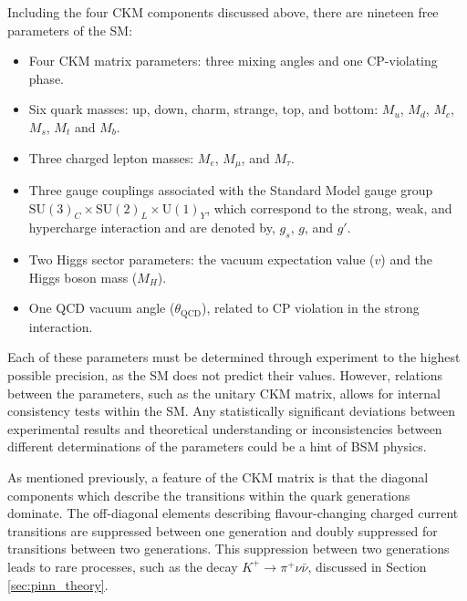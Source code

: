 \documentclass[../main.tex]{subfiles}
\begin{document}
    Including the four \gls{CKM} components discussed above, there are nineteen free parameters of the \gls{SM}:
    \begin{itemize}
        \item Four \gls{CKM} matrix parameters: three mixing angles and one CP-violating phase.
        \item Six quark masses: up, down, charm, strange, top, and bottom: $M_u$, $M_d$, $M_c$, $M_s$, $M_t$ and $M_b$.
        \item Three charged lepton masses: $M_e$, $M_\mu$, and $M_\tau$.
        \item Three gauge couplings associated with the Standard Model gauge group $\mathrm{SU}(3)_C \times \mathrm{SU}(2)_L \times \mathrm{U}(1)_Y$, which correspond to the strong, weak, and hypercharge interaction and are denoted by, $g_s$, $g$, and $g'$.
        \item Two Higgs sector parameters: the vacuum expectation value ($v$) and the Higgs boson mass ($M_H$).
        \item One \gls{QCD} vacuum angle ($\theta_{\text{QCD}}$), related to CP violation in the strong interaction.
    \end{itemize}
    Each of these parameters must be determined through experiment to the highest possible precision, as the \gls{SM} does not predict their values. However, relations between the parameters, such as the unitary \gls{CKM} matrix, allows for internal consistency tests within the \gls{SM}.
    Any statistically significant deviations between experimental results and theoretical understanding or inconsistencies between different determinations of the parameters could be a hint of \gls{BSM} physics. 

    As mentioned previously, a feature of the \gls{CKM} matrix is that the diagonal components which describe the transitions within the quark generations dominate. The off-diagonal elements describing  
    flavour-changing charged current transitions are suppressed between one generation and doubly suppressed for transitions between two generations. This suppression between two generations leads to rare processes, such as the decay $K^+ \to \pi^+ \nu \bar{\nu}$, discussed in Section \ref{sec:pinn_theory}. 
\end{document}
